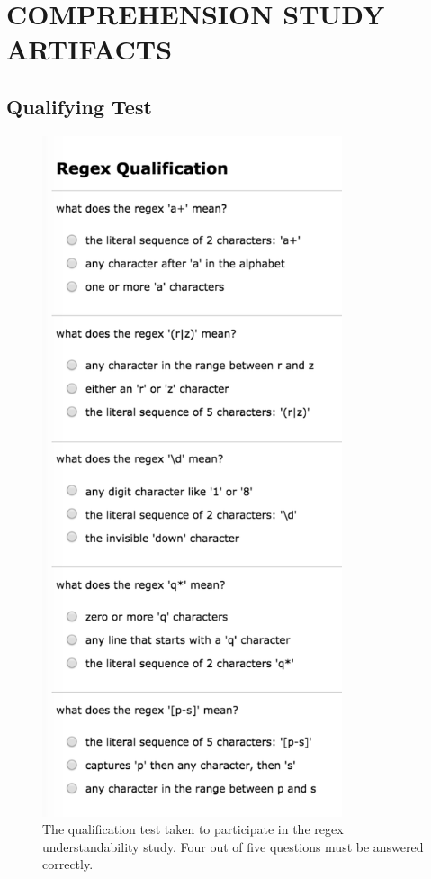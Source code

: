 \chapter{COMPREHENSION STUDY ARTIFACTS}

\section*{Qualifying Test}

\begin{figure}[tb]
\centering
\includegraphics[height=20cm,keepaspectratio]{nontex/qualificationTest}
\vspace{-12pt}
\caption{The qualification test taken to participate in the regex understandability study.  Four out of five questions must be answered correctly.}
\vspace{-6pt}
\label{fig:qualTest}
\end{figure}

